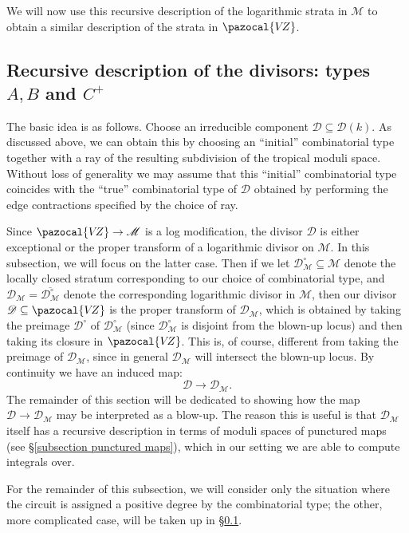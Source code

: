 \documentclass[11pt]{amsart}
\newcommand{\VZ}{\pazocal{V\!Z}}
\renewcommand{\to}{\rightarrow}
\newcommand{\Mcal}{\mathcal{M}}
\newcommand{\Dcal}{\mathcal{D}}
\theoremstyle{definition}
\theoremstyle{definition}
\begin{document}
We will now use this recursive description of the logarithmic strata in $\Mcal$ to obtain a similar description of the strata in $\VZ$.



\subsection{Recursive description of the divisors: types $A,B$ and $C^+$}

The basic idea is as follows. Choose an irreducible component $\Dcal \subseteq \Dcal(k)$. As discussed above, we can obtain this by choosing an ``initial'' combinatorial type together with a ray of the resulting subdivision of the tropical moduli space. Without loss of generality we may assume that this ``initial'' combinatorial type coincides with the ``true'' combinatorial type of $\Dcal$ obtained by performing the edge contractions specified by the choice of ray.

Since $\VZ \to \Mcal$ is a log modification, the divisor $\Dcal$ is either exceptional or the proper transform of a logarithmic divisor on $\Mcal$. In this subsection, we will focus on the latter case. Then if we let $\Dcal_{\Mcal}^\circ\subseteq \Mcal$ denote the locally closed stratum corresponding to our choice of combinatorial type, and $\Dcal_\Mcal = \overline{\Dcal^\circ_\Mcal}$ denote the corresponding logarithmic divisor in $\Mcal$, then our divisor $\Dcal\subseteq\VZ$ is the proper transform of $\Dcal_\Mcal$, which is obtained by taking the preimage $\Dcal^\circ$ of $\Dcal_\Mcal^\circ$ (since $\Dcal^\circ_\Mcal$ is disjoint from the blown-up locus) and then taking its closure in $\VZ$. This is, of course, different from taking the preimage of $\Dcal_\Mcal$, since in general $\Dcal_\Mcal$ will intersect the blown-up locus. By continuity we have an induced map:
\begin{equation*} \Dcal \to \Dcal_\Mcal. \end{equation*}
The remainder of this section will be dedicated to showing how the map $\Dcal \to \Dcal_\Mcal$ may be interpreted as a blow-up. The reason this is useful is that $\Dcal_\Mcal$ itself has a recursive description in terms of moduli spaces of punctured maps (see \S \ref{subsection punctured maps}), which in our setting we are able to compute integrals over.

For the remainder of this subsection, we will consider only the situation where the circuit is assigned a positive degree by the combinatorial type; the other, more complicated case, will be taken up in \S \ref{}.
\end{document}
